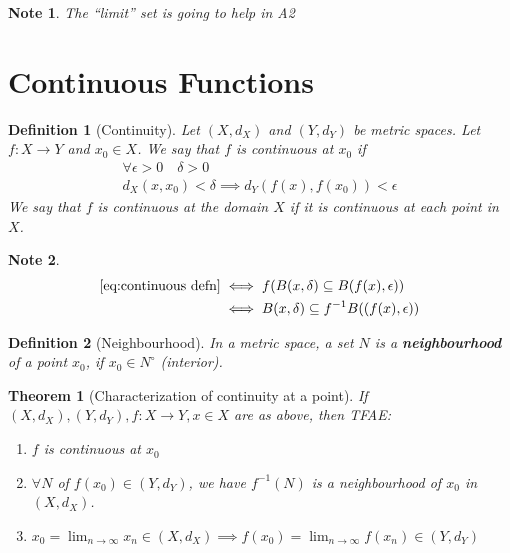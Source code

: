 \documentclass[11pt, oneside]{book}
\theoremstyle{break}
\newtheorem{thm}{Theorem}[section]
\newtheorem*{note}{Note}
\newtheorem{defn}{Definition}[section]
\begin{document}
\begin{note}
	The ``limit'' set is going to help in A2
\end{note}

\section{Continuous Functions}\label{sect:cont functions}

\begin{defn}[Continuity]\label{defn:continuity}
	Let $(X, d_X)$ and $(Y, d_Y)$ be metric spaces. Let $f: X \to Y$ and $x_0 \in X$. We say that $f$ is continuous at $x_0$ if
	\begin{gather}
		\forall \epsilon > 0 \quad \delta > 0 \nonumber \\
		d_X(x, x_0) < \delta \implies d_Y(f(x), f(x_0)) < \epsilon \label{eq:continuous defn}
	\end{gather}
	We say that $f$ is continuous at the domain $X$ if it is continuous at each point in $X$.
\end{defn}

\begin{note}
	\begin{align*}
		\autoref{eq:continuous defn} &\iff f(B(x, \delta) \subseteq B(f(x), \epsilon) ) \\
			&\iff B(x, \delta) \subseteq f^{-1}B((f(x), \epsilon))
	\end{align*}
\end{note}

\begin{defn}[Neighbourhood]\label{defn:neighbourhood}
	In a metric space, a set $N$ is a \textbf{neighbourhood} of a point $x_0$, if $x_0 \in N^\circ$ (interior).
\end{defn}

\begin{thm}[Characterization of continuity at a point]\label{thm:char of cont at a point}
	If $(X, d_X), (Y, d_Y), f : X \to Y, x \in X$ are as above, then TFAE:
	\begin{enumerate}
		\item $f$ is continuous at $x_0$
		\item $\forall N$ of $f(x_0) \in (Y, d_Y)$, we have $f^{-1}(N)$ is a neighbourhood of $x_0$ in $(X, d_X)$.
		\item $x_0 = \lim_{n \to \infty} x_n \in (X, d_X) \implies f(x_0) = \lim_{n \to \infty} f(x_n) \in (Y, d_Y)$
	\end{enumerate}
\end{thm}
\end{document}
